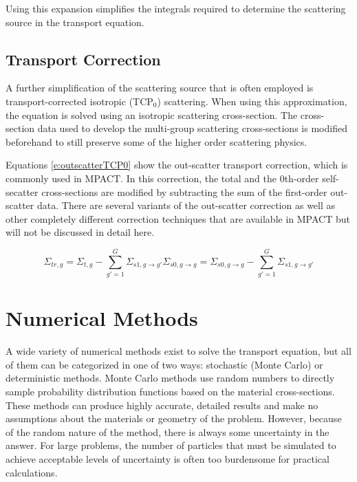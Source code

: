 Using this expansion simplifies the integrals required to determine the scattering source in the transport equation.  

\subsection{Transport Correction}

A further simplification of the scattering source that is often employed is transport-corrected isotropic (TCP$_0$) scattering.  When using this approximation, the equation is solved using an isotropic scattering cross-section.  The cross-section data used to develop the multi-group scattering cross-sections is modified beforehand to still preserve some of the higher order scattering physics.

Equations \ref{e:outscatterTCP0} show the out-scatter transport correction, which is commonly used in MPACT.  In this correction, the total and the 0th-order self-secatter cross-sections are modified by subtracting the sum of the first-order out-scatter data.  There are several variants of the out-scatter correction as well as other completely different correction techniques  that are available in MPACT but will not be discussed in detail here.

\begin{subequations}\label{e:outscatterTCP0}
\begin{equation}
\Sigma_{tr,g} = \Sigma_{t,g} - \sum_{g'=1}^G \Sigma_{s1,g\rightarrow g'}
\end{equation}
\begin{equation}
\Sigma_{s0,g\rightarrow g} = \Sigma_{s0,g\rightarrow g} - \sum_{g'=1}^G \Sigma_{s1,g\rightarrow g'}
\end{equation}
\end{subequations}

\section{Numerical Methods}

A wide variety of numerical methods exist to solve the transport equation, but all of them can be categorized in one of two ways: stochastic (Monte Carlo) or deterministic methods.  Monte Carlo methods use random numbers to directly sample probability distribution functions based on the material cross-sections.  These methods can produce highly accurate, detailed results and make no assumptions about the materials or geometry of the problem.  However, because of the random nature of the method, there is always some uncertainty in the answer.  For large problems, the number of particles that must be simulated to achieve acceptable levels of uncertainty is often too burdensome  for practical calculations.

